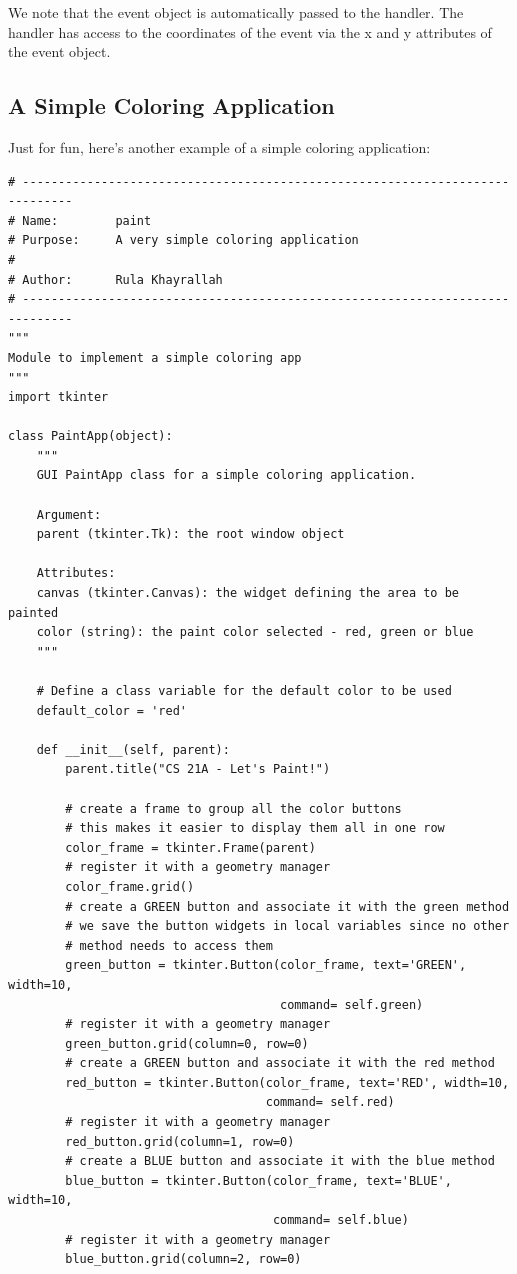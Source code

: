 \documentclass{article}
\begin{document}
We note that the event object is automatically passed to the handler.  The handler has access to the coordinates of the event via the x and y attributes of the event object.

\subsection{A Simple Coloring Application}
Just for fun, here's another example of a simple coloring application:

\begin{lstlisting}
# -----------------------------------------------------------------------------
# Name:        paint
# Purpose:     A very simple coloring application
#
# Author:      Rula Khayrallah
# -----------------------------------------------------------------------------
"""
Module to implement a simple coloring app
"""
import tkinter

class PaintApp(object):
    """
    GUI PaintApp class for a simple coloring application.

    Argument:
    parent (tkinter.Tk): the root window object

    Attributes:
    canvas (tkinter.Canvas): the widget defining the area to be painted
    color (string): the paint color selected - red, green or blue
    """

    # Define a class variable for the default color to be used
    default_color = 'red'

    def __init__(self, parent):
        parent.title("CS 21A - Let's Paint!")

        # create a frame to group all the color buttons
        # this makes it easier to display them all in one row
        color_frame = tkinter.Frame(parent)
        # register it with a geometry manager
        color_frame.grid()
        # create a GREEN button and associate it with the green method
        # we save the button widgets in local variables since no other
        # method needs to access them
        green_button = tkinter.Button(color_frame, text='GREEN', width=10,
                                      command= self.green)
        # register it with a geometry manager
        green_button.grid(column=0, row=0)
        # create a GREEN button and associate it with the red method
        red_button = tkinter.Button(color_frame, text='RED', width=10,
                                    command= self.red)
        # register it with a geometry manager
        red_button.grid(column=1, row=0)
        # create a BLUE button and associate it with the blue method
        blue_button = tkinter.Button(color_frame, text='BLUE', width=10,
                                     command= self.blue)
        # register it with a geometry manager
        blue_button.grid(column=2, row=0)


\end{lstlisting}
\end{document}
